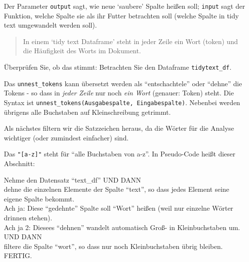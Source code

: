 \documentclass[12pt,ngerman,]{book}
\makeatletter
\newenvironment{Shaded}{\begin{snugshade}}{\end{snugshade}}
\newcommand{\KeywordTok}[1]{\textcolor[rgb]{0.13,0.29,0.53}{\textbf{{#1}}}}
\newcommand{\StringTok}[1]{\textcolor[rgb]{0.31,0.60,0.02}{{#1}}}
\newcommand{\CommentTok}[1]{\textcolor[rgb]{0.56,0.35,0.01}{\textit{{#1}}}}
\newcommand{\NormalTok}[1]{{#1}}
\newenvironment{kframe}{%
\medskip{}
\setlength{\fboxsep}{.8em}
 \def\at@end@of@kframe{}%
 \ifinner\ifhmode%
  \def\at@end@of@kframe{\end{minipage}}%
  \begin{minipage}{\columnwidth}%
 \fi\fi%
 \def\FrameCommand##1{\hskip\@totalleftmargin \hskip-\fboxsep
 \colorbox{shadecolor}{##1}\hskip-\fboxsep
     \hskip-\linewidth \hskip-\@totalleftmargin \hskip\columnwidth}%
 \MakeFramed {\advance\hsize-\width
   \@totalleftmargin\z@ \linewidth\hsize
   \@setminipage}}%
 {\par\unskip\endMakeFramed%
 \at@end@of@kframe}
\renewenvironment{Shaded}{\begin{kframe}}{\end{kframe}}
\let\BeginKnitrBlock\begin \let\EndKnitrBlock\end
\makeatother
\begin{document}
Der Parameter \texttt{output} sagt, wie neue `saubere' Spalte heißen
soll; \texttt{input} sagt der Funktion, welche Spalte sie als ihr Futter
betrachten soll (welche Spalte in tidy text umgewandelt werden soll).

\begin{quote}
In einem `tidy text Dataframe' steht in jeder Zeile ein Wort (token) und
die Häufigkeit des Worts im Dokument.
\end{quote}

Überprüfen Sie, ob das stimmt: Betrachten Sie den Dataframe
\texttt{tidytext\_df}.

Das \texttt{unnest\_tokens} kann übersetzt werden als ``entschachtele''
oder ``dehne'' die Tokens - so dass in \emph{jeder Zeile} nur noch
\emph{ein Wort} (genauer: Token) steht. Die Syntax ist
\texttt{unnest\_tokens(Ausgabespalte,\ Eingabespalte)}. Nebenbei werden
übrigens alle Buchstaben auf Kleinschreibung getrimmt.

Als nächstes filtern wir die Satzzeichen heraus, da die Wörter für die
Analyse wichtiger (oder zumindest einfacher) sind.

\begin{Shaded}
\end{Shaded}

Das \texttt{"{[}a-z{]}"} steht für ``alle Buchstaben von a-z''. In
Pseudo-Code heißt dieser Abschnitt:

\BeginKnitrBlock{rmdpseudocode}
Nehme den Datensatz ``text\_df'' UND DANN\\
dehne die einzelnen Elemente der Spalte ``text'', so dass jedes Element
seine eigene Spalte bekommt.\\
Ach ja: Diese ``gedehnte'' Spalte soll ``Wort'' heißen (weil nur
einzelne Wörter drinnen stehen).\\
Ach ja 2: Diesees ``dehnen'' wandelt automatisch Groß- in
Kleinbuchstaben um. UND DANN\\
filtere die Spalte ``wort'', so dass nur noch Kleinbuchstaben übrig
bleiben. FERTIG.
\EndKnitrBlock{rmdpseudocode}
\end{document}

